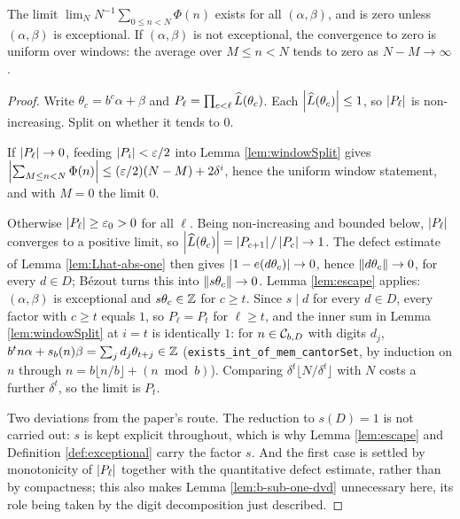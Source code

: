 \begin{theorem}[Lemma 4.7]
  \label{thm:irrational}
  \leanok
  The limit
  $\lim_{N} N^{-1}\!\!\sum_{0 \leq n < N} \Phi(n)$
  exists for all $(\alpha, \beta)$, and is zero unless $(\alpha,\beta)$ is
  exceptional. If $(\alpha,\beta)$ is not exceptional, the convergence to
  zero is uniform over windows: the average over $M \leq n < N$ tends to zero
  as $N - M \to \infty$.
\end{theorem}
\begin{proof}
  \leanok
  Write $\theta_c = b^c\alpha + \beta$ and $P_\ell = \prod_{c<\ell}
  \widehat{L}(\theta_c)$.  Each $\left\lvert \widehat{L}(\theta_c) \right\rvert \leq 1$, so
  $\left\lvert P_\ell \right\rvert$ is non-increasing.  Split on whether it tends to $0$.

  If $\left\lvert P_\ell \right\rvert \to 0$, feeding $\left\lvert P_i \right\rvert < \varepsilon/2$ into Lemma
  \ref{lem:windowSplit} gives $\left\lvert \sum_{M \leq n < N}\Phi(n) \right\rvert \leq
  (\varepsilon/2)(N-M) + 2\delta^i$, hence the uniform window statement, and
  with $M = 0$ the limit $0$.

  Otherwise $\left\lvert P_\ell \right\rvert \geq \varepsilon_0 > 0$ for all $\ell$.  Being
  non-increasing and bounded below, $\left\lvert P_\ell \right\rvert$ converges to a positive
  limit, so $\left\lvert \widehat{L}(\theta_c) \right\rvert = \left\lvert P_{c+1} \right\rvert/\left\lvert P_c \right\rvert \to 1$.  The
  defect estimate of Lemma \ref{lem:Lhat-abs-one} then gives
  $\left\lvert 1 - e(d\theta_c) \right\rvert \to 0$, hence $\left\lVert d\theta_c \right\rVert \to 0$, for every
  $d \in D$; B\'ezout turns this into $\left\lVert s\theta_c \right\rVert \to 0$.  Lemma
  \ref{lem:escape} applies: $(\alpha,\beta)$ is exceptional and
  $s\theta_c \in \mathbb{Z}$ for $c \geq t$.  Since $s \mid d$ for every $d \in D$,
  every factor with $c \geq t$ equals $1$, so $P_\ell = P_t$ for
  $\ell \geq t$, and the inner sum in Lemma \ref{lem:windowSplit} at $i = t$
  is identically $1$: for $n \in \mathcal{C}_{b,D}$ with digits $d_j$,
  $b^t n \alpha + s_b(n)\beta = \sum_j d_j \theta_{t+j} \in \mathbb{Z}$
  (\texttt{exists\_int\_of\_mem\_cantorSet}, by induction on $n$ through
  $n = b\lfloor n/b\rfloor + (n \bmod b)$).  Comparing $\delta^t\lfloor
  N/\delta^t\rfloor$ with $N$ costs a further $\delta^t$, so the limit is
  $P_t$.

  Two deviations from the paper's route.  The reduction to $s(D) = 1$ is not
  carried out: $s$ is kept explicit throughout, which is why Lemma
  \ref{lem:escape} and Definition \ref{def:exceptional} carry the factor $s$.
  And the first case is settled by monotonicity of $\left\lvert P_\ell \right\rvert$ together
  with the quantitative defect estimate, rather than by compactness; this
  also makes Lemma \ref{lem:b-sub-one-dvd} unnecessary here, its role being
  taken by the digit decomposition just described.
\end{proof}

